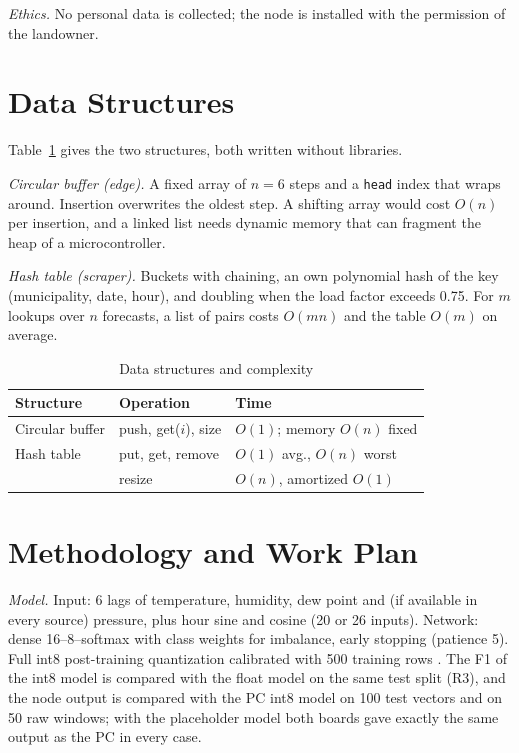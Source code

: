 \documentclass[conference]{IEEEtran}
\begin{document}
\textit{Ethics.} No personal data is collected; the node is installed with the permission of the landowner.

\section{Data Structures}
Table~\ref{tab:ds} gives the two structures, both written without libraries.

\textit{Circular buffer (edge).} A fixed array of $n=6$ steps and a \texttt{head} index that wraps around. Insertion overwrites the oldest step. A shifting array would cost $O(n)$ per insertion, and a linked list needs dynamic memory that can fragment the heap of a microcontroller.

\textit{Hash table (scraper).} Buckets with chaining, an own polynomial hash of the key (municipality, date, hour), and doubling when the load factor exceeds 0.75. For $m$ lookups over $n$ forecasts, a list of pairs costs $O(mn)$ and the table $O(m)$ on average.

\begin{table}[t]
\caption{Data structures and complexity}
\label{tab:ds}
\centering
\begin{tabular}{@{}lll@{}}
\toprule
Structure & Operation & Time \\
\midrule
Circular buffer & push, get($i$), size & $O(1)$; memory $O(n)$ fixed \\
Hash table & put, get, remove & $O(1)$ avg., $O(n)$ worst \\
 & resize & $O(n)$, amortized $O(1)$ \\
\bottomrule
\end{tabular}
\end{table}

\section{Methodology and Work Plan}
\textit{Model.} Input: 6 lags of temperature, humidity, dew point and (if available in every source) pressure, plus hour sine and cosine (20 or 26 inputs). Network: dense 16--8--softmax with class weights for imbalance, early stopping (patience 5). Full int8 post-training quantization calibrated with 500 training rows \cite{jacob2018}. The F1 of the int8 model is compared with the float model on the same test split (R3), and the node output is compared with the PC int8 model on 100 test vectors and on 50 raw windows; with the placeholder model both boards gave exactly the same output as the PC in every case.
\end{document}
